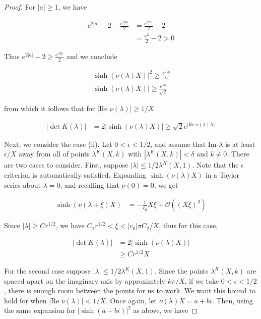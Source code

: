 \documentclass[thesis.tex]{subfiles}
\begin{document}
\begin{lemma}
\begin{proof}
For $|a| \geq 1$, we have

\begin{align*}
e^{2|a|} - 2 - \frac{e^{2|a|}}{2} 
&= \frac{e^{2|a|}}{2} - 2 \\
&= \frac{e^2}{2} - 2 > 0
\end{align*}

Thus $e^{2|a|} - 2 \geq \frac{e^{2|a|}}{2}$ and we conclude

\begin{align*}
|\sinh(\nu(\lambda) X)|^2 \geq \frac{e^{2|a|}}{2} \\
|\sinh(\nu(\lambda) X)| \geq \frac{e^{|a|}}{\sqrt{2}}
\end{align*}

from which it follows that for $|\text{Re } \nu(\lambda)| \geq 1/X$

\begin{align*}
|\det K(\lambda)| &= 2 |\sinh(\nu(\lambda) X)|
\geq \sqrt{2} e^{|\text{Re }\nu(\lambda)X|}
\end{align*}

Next, we consider the case (ii). Let $0 < \epsilon < 1/2$, and assume that $\text{Im }\lambda$ is at least $\epsilon/X$ away from all of points $\lambda^K(X,k)$ with $|\lambda^K(X,k)| < \delta$ and $k \neq 0$. There are two cases to consider. First, suppose $|\lambda| \leq 1/2 \lambda^K(X,1)$. Note that the $\epsilon$ criterion is automatically satisfied. Expanding $\sinh( \nu(\lambda) X)$ in a Taylor series about $\lambda = 0$, and recalling that $\nu(0) = 0$, we get

\begin{align*}
\sinh(\nu(\lambda + \xi) X) &= -\frac{1}{c_0}X\xi + \mathcal{O}((X \xi)^3)
\end{align*}

Since $|\lambda| \geq C r^{1/2}$, we have $C_1 r^{1/2} < \xi < |c_0| \pi C_2/X$, thus for this case,

\begin{align*}
|\det K(\lambda)| &= 2 |\sinh(\nu(\lambda) X)| \\
& \geq C r^{1/2}X
\end{align*}

For the second case suppose $|\lambda| \leq 1/2 \lambda^K(X,1)$. Since the points $\lambda^K(X,k)$ are spaced apart on the imaginary axis by approximtely $k \pi/X$, if we take $0 < \epsilon < 1/2$, there is enough room between the points for us to work. We want this bound to hold for when $|\text{Re } \nu(\lambda)| < 1/X$. Once again, let $\nu(\lambda) X = a + b i$. Then, using the same expansion for $|\sinh(a + b i)|^2$ as above, we have


\end{proof}
\end{lemma}
\end{document}
